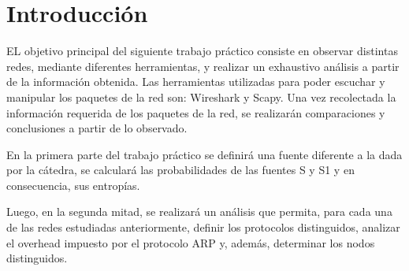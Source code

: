 \section{Introducción}
EL objetivo principal del siguiente trabajo práctico consiste en observar distintas redes, mediante diferentes herramientas, y realizar un exhaustivo análisis a partir de la información obtenida. Las herramientas utilizadas para poder escuchar y manipular los paquetes de la red son: Wireshark y Scapy. Una vez recolectada la información requerida de los paquetes de la red, se realizarán comparaciones y conclusiones a partir de lo observado. 

En la primera parte del trabajo práctico se definirá una fuente diferente a la dada por la cátedra, se calculará las probabilidades de las fuentes S y S1 y en consecuencia, sus entropías. 

Luego, en la segunda mitad, se realizará un análisis que permita, para cada una de las redes estudiadas anteriormente, definir los protocolos distinguidos, analizar el overhead impuesto por el protocolo ARP y, además, determinar los nodos distinguidos. 